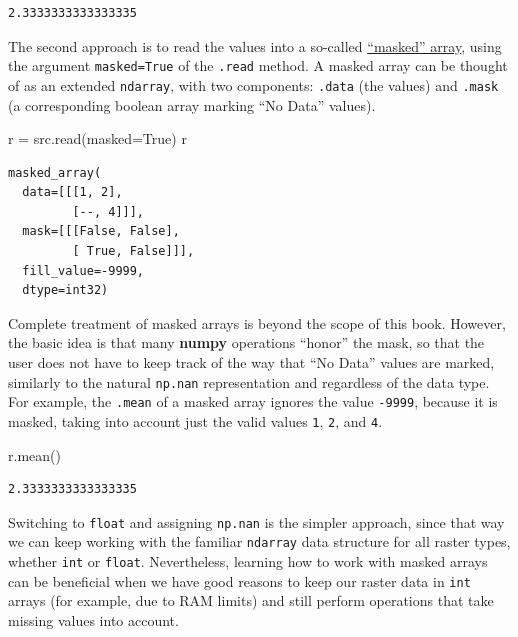 \documentclass[
  letterpaper,
]{krantz}
\newenvironment{Shaded}{\begin{snugshade}}{\end{snugshade}}
\newcommand{\NormalTok}[1]{\textcolor[rgb]{0.00,0.23,0.31}{#1}}
\newcommand{\OperatorTok}[1]{\textcolor[rgb]{0.37,0.37,0.37}{#1}}
\newcommand{\VariableTok}[1]{\textcolor[rgb]{0.07,0.07,0.07}{#1}}
\begin{document}
\begin{verbatim}
2.3333333333333335
\end{verbatim}

The second approach is to read the values into a so-called
\href{https://numpy.org/doc/stable/reference/maskedarray.generic.html\#what-is-a-masked-array}{``masked''
array}, using the argument \texttt{masked=True} of the \texttt{.read}
method. A masked array can be thought of as an extended
\texttt{ndarray}, with two components: \texttt{.data} (the values) and
\texttt{.mask} (a corresponding boolean array marking ``No Data''
values).

\begin{Shaded}
\begin{Highlighting}[]
\NormalTok{r }\OperatorTok{=}\NormalTok{ src.read(masked}\OperatorTok{=}\VariableTok{True}\NormalTok{)}
\NormalTok{r}
\end{Highlighting}
\end{Shaded}

\begin{verbatim}
masked_array(
  data=[[[1, 2],
         [--, 4]]],
  mask=[[[False, False],
         [ True, False]]],
  fill_value=-9999,
  dtype=int32)
\end{verbatim}

Complete treatment of masked arrays is beyond the scope of this book.
However, the basic idea is that many \textbf{numpy} operations ``honor''
the mask, so that the user does not have to keep track of the way that
``No Data'' values are marked, similarly to the natural \texttt{np.nan}
representation and regardless of the data type. For example, the
\texttt{.mean} of a masked array ignores the value \texttt{-9999},
because it is masked, taking into account just the valid values
\texttt{1}, \texttt{2}, and \texttt{4}.

\begin{Shaded}
\begin{Highlighting}[]
\NormalTok{r.mean()}
\end{Highlighting}
\end{Shaded}

\begin{verbatim}
2.3333333333333335
\end{verbatim}

Switching to \texttt{float} and assigning \texttt{np.nan} is the simpler
approach, since that way we can keep working with the familiar
\texttt{ndarray} data structure for all raster types, whether
\texttt{int} or \texttt{float}. Nevertheless, learning how to work with
masked arrays can be beneficial when we have good reasons to keep our
raster data in \texttt{int} arrays (for example, due to RAM limits) and
still perform operations that take missing values into account.
\end{document}
